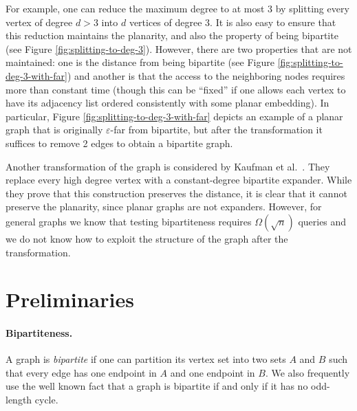 \documentclass[11pt]{article}
\newcommand{\eps}{\ensuremath{\epsilon}}
\def\epsilon{\ensuremath{\varepsilon}}
\begin{document}
For example, one can reduce the maximum degree to at most $3$ by splitting every vertex of degree $d > 3$ into $d$ vertices of degree $3$. It is also easy to ensure that this reduction maintains the planarity, and also the property of being bipartite (see Figure \ref{fig:splitting-to-deg-3}). However, there are two properties that are not maintained: one is the distance from being bipartite (see Figure \ref{fig:splitting-to-deg-3-with-far}) and another is that the access to the neighboring nodes requires more than constant time (though this can be ``fixed'' if one allows each vertex to have its adjacency list ordered consistently with some planar embedding). In particular, Figure \ref{fig:splitting-to-deg-3-with-far} depicts an example of a planar graph that is originally $\eps$-far from bipartite, but after the transformation it suffices to remove 2 edges to obtain a bipartite graph.





Another transformation of the graph is considered by Kaufman et al.\ \cite{KKR04}. They replace every high degree vertex with a constant-degree bipartite expander. While they prove that this construction preserves the distance, it is clear that it cannot preserve the planarity, since planar graphs are not expanders. However, for general graphs we know that testing bipartiteness requires $\Omega(\sqrt{n})$ queries \cite{GR97} and we do not know how to exploit the structure of the graph after the transformation.



\section{Preliminaries}
\label{sec:preliminaries}

\paragraph{Bipartiteness.}

A graph is \emph{bipartite} if one can partition its vertex set into two sets $A$ and $B$ such that every edge has one endpoint in $A$ and one endpoint in $B$. We also frequently use the well known fact that a graph is bipartite if and only if it has no odd-length cycle.
\end{document}
